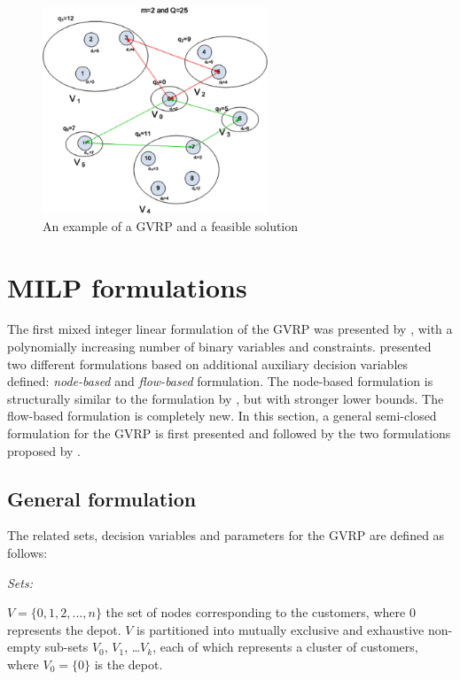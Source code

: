 \documentclass[letterpaper,12pt,onehalfspacing,twoside]{article}
\theoremstyle{msds}
\begin{document}
\begin{figure}[htbp]
\centering
\includegraphics[width=0.6\textwidth]{example_gvrp.png}
\caption{An example of a GVRP and a feasible solution \citep{POP201297}}
\label{fig:example_gvrp}
\end{figure}


\section{MILP formulations}
The first mixed integer linear formulation of the GVRP was presented by \cite{bektasKara}, with a polynomially increasing number of binary variables and constraints. 
\cite{POP201297} presented two different formulations based on additional auxiliary decision variables defined: \emph{node-based} and \emph{flow-based} formulation. The node-based formulation is structurally similar to the formulation by \cite{bektasKara}, but with stronger lower bounds. The flow-based formulation is completely new. In this section, a general semi-closed formulation for the GVRP is first presented and followed by the two formulations proposed by \cite{POP201297}.

\subsection{General formulation}
The related sets, decision variables and parameters for the GVRP are defined as follows:

\textit{Sets:}

$V = \{0,1,2,\ldots,n\}$ the set of nodes corresponding to the customers, where 0 represents the depot. $V$ is partitioned into mutually exclusive and exhaustive non-empty sub-sets $V_0$, $V_1$, \ldots $V_k$, each of which represents a cluster of customers, where $V_0 = \{0\}$ is the depot.
\end{document}
